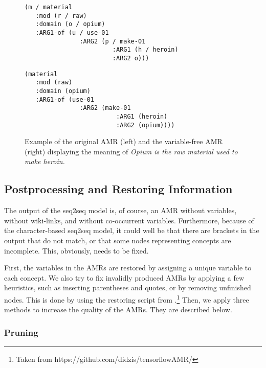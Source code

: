 \documentclass[a4paper,10pt,twoside]{article}
\begin{document}
\begin{figure*}[!htb]
{
  \begin{minipage}{.5\textwidth}\centering
  \begin{Verbatim}[commandchars=\\\{\}]
(m / material
   :mod (r / raw)
   :domain (o / opium)
   :ARG1-of (u / use-01
               :ARG2 (p / make-01
                        :ARG1 (h / heroin)
                        :ARG2 o)))
\end{Verbatim}
  \end{minipage}
  \begin{minipage}{0.5\textwidth}
  \begin{Verbatim}[commandchars=\\\{\}]
(material
   :mod (raw)
   :domain (opium)
   :ARG1-of (use-01
               :ARG2 (make-01
                         :ARG1 (heroin)
                         :ARG2 (opium))))
\end{Verbatim}
  \end{minipage}
  \caption{\label{fig:preprocessing}Example of the original AMR (left) and the variable-free AMR (right) displaying the meaning of \emph{Opium is the raw material used to make heroin.}}
}
\end{figure*}

\subsection{Postprocessing and Restoring Information}

The output of the seq2seq model is, of course, an AMR without variables, without wiki-links, and without co-occurrent variables.
Furthermore, because of the character-based seq2seq model, it could well be that there are brackets in the output that do not match, or that some nodes representing concepts are incomplete. This, obviously, needs to be fixed.

First, the variables in the AMRs are restored by assigning a unique variable to each concept. We also try to fix invalidly produced AMRs by applying a few heuristics, such as inserting parentheses and quotes, or by removing unfinished nodes. This is done by using the restoring script from .\footnote{Taken from https://github.com/didzis/tensorflowAMR/} 
Then, we apply three methods to increase the quality of the AMRs. They are described below.

\subsubsection{Pruning}
\end{document}
